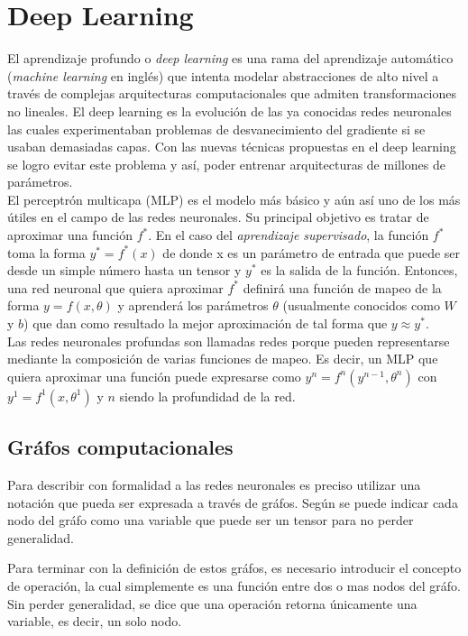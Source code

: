 \newpage
\section{Deep Learning}
	
El aprendizaje profundo o \textit{deep learning} es una rama del aprendizaje automático (\textit{machine learning} en inglés) que intenta modelar abstracciones de alto nivel a través de complejas arquitecturas computacionales que admiten transformaciones no lineales. El deep learning es la evolución de las ya conocidas redes neuronales las cuales experimentaban problemas de desvanecimiento del gradiente si se usaban demasiadas capas. Con las nuevas técnicas propuestas en el deep learning se logro evitar este problema y así, poder entrenar arquitecturas de millones de parámetros. \\

El perceptrón multicapa (MLP) es el modelo más básico y aún así uno de los más útiles en el campo de las redes neuronales. Su principal objetivo es tratar de aproximar una función $f^{*}$. En el caso del \textit{aprendizaje supervisado}, la función $f^{*}$ toma la forma $y^{*} = f^{*}(x)$ de donde x es un parámetro de entrada que puede ser desde un simple número hasta un tensor y $y^{*}$ es la salida de la función. Entonces, una red neuronal que quiera aproximar $f^{*}$ definirá una función de mapeo de la forma $y = f(x,\theta)$ y aprenderá los parámetros $\theta$ (usualmente conocidos como $W$ y $b$) que dan como resultado la mejor aproximación de tal forma que $y \approx y^{*}$. \\

Las redes neuronales profundas son llamadas redes porque pueden representarse mediante la composición de varias funciones de mapeo. Es decir, un MLP que quiera aproximar una función puede expresarse como $y^{n} = f^{n}(y^{n-1}, \theta^{n})$ con $y^{1} = f^{1}(x, \theta^{1})$ y $n$ siendo la profundidad de la red. 

	\subsection{Gráfos computacionales}
	Para describir con formalidad a las redes neuronales es preciso utilizar una notación que pueda ser expresada a través de gráfos. Según \cite{deeplearningbook} se puede indicar cada nodo del gráfo como una variable que puede ser un tensor para no perder generalidad. 
	
	Para terminar con la definición de estos gráfos, es necesario introducir el concepto de operación, la cual simplemente es una función entre dos o mas nodos del gráfo. Sin perder generalidad, se dice que una operación retorna únicamente una variable, es decir, un solo nodo.
	
